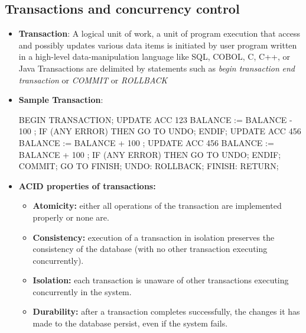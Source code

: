 \documentclass{report}
\begin{document}
    \subsection{Transactions and concurrency control}
    \begin{itemize}
        \item \textbf{Transaction}: A logical unit of work, a unit of program execution that access and possibly updates various data items
            \bigbreak \noindent 
            is initiated by user program written in a high-level data-manipulation language like  SQL, COBOL, C, C++, or Java
            \bigbreak \noindent 
            Transactions are delimited by statements such as \textit{begin transaction} \textit{end transaction} or \textit{COMMIT} or \textit{ROLLBACK}
        \item \textbf{Sample Transaction}: 
            \bigbreak \noindent 
            \begin{cppcode}
                BEGIN TRANSACTION;
                    UPDATE ACC 123 { BALANCE := BALANCE - 100 };
                    IF (ANY ERROR) THEN
                        GO TO UNDO;
                    ENDIF;
                    UPDATE ACC 456 { BALANCE := BALANCE + 100 };
                    UPDATE ACC 456 { BALANCE := BALANCE + 100 };
                    IF (ANY ERROR) THEN
                        GO TO UNDO;
                    ENDIF;
                    COMMIT;
                    GO TO FINISH;
                UNDO:
                    ROLLBACK;
                FINISH:
                    RETURN;
            \end{cppcode}
        \item \textbf{ACID properties of transactions:}
            \begin{itemize}
                \item \textbf{Atomicity:} either all operations of the transaction are implemented properly or none are.
                \item \textbf{Consistency:} execution of a transaction in isolation preserves the consistency of the database (with no other transaction executing concurrently).
                \item \textbf{Isolation:} each transaction is unaware of other transactions executing concurrently in the system.
                \item \textbf{Durability:} after a transaction completes successfully, the changes it has made to the database persist, even if the system fails.
            \end{itemize}

\end{itemize}
\end{document}
